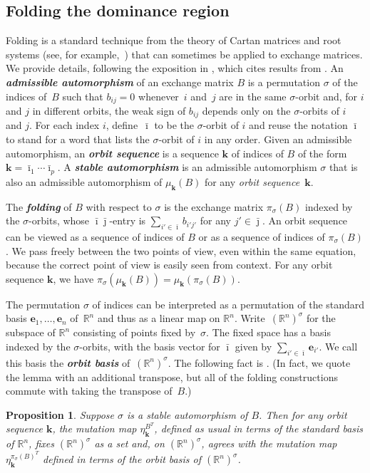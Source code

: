 \documentclass{amsart}
\newtheorem{proposition}{Proposition}[section]
\theoremstyle{definition}
\theoremstyle{remark}
\numberwithin{equation}{section}
\newcommand{\newword}[1]{\textbf{\emph{#1}}}
\newcommand{\reals}{\mathbb R}
\newcommand{\0}{{\mathbf{0}}}
\newcommand{\kk}{{\boldsymbol{k}}}
\newcommand{\e}{\mathbf{e}}
\begin{document}
\subsection{Folding the dominance region}\label{fold sec}
Folding is a standard technique from the theory of Cartan matrices and root systems (see, for example,~\cite{StembridgeFolding}) that can sometimes be applied to exchange matrices.
We provide details, following the exposition in \cite[Sections~2.3--2.4]{VielThesis}, which cites results from \cite{CaoHuangLi,DemonetThesis,DupontNonSimp,NS14}.
An \newword{admissible automorphism} of an exchange matrix $B$ is a permutation $\sigma$ of the indices of~$B$ such that $b_{ij}=0$ whenever~$i$ and~$j$ are in the same $\sigma$-orbit and, for $i$ and $j$ in different orbits, the weak sign of $b_{ij}$ depends only on the $\sigma$-orbits of $i$ and $j$.
For each index $i$, define~$\bar\imath$ to be the $\sigma$-orbit of $i$ and reuse the notation $\bar\imath$ to stand for a word that lists the $\sigma$-orbit of $i$ in any order.
Given an admissible automorphism, an \newword{orbit sequence} is a sequence $\kk$ of indices of $B$ of the form $\kk=\bar\imath_1\cdots\bar\imath_p$.
A \newword{stable automorphism} is an admissible automorphism $\sigma$ that is also an admissible automorphism of $\mu_\kk(B)$ for any \emph{orbit sequence}~$\kk$.

The \newword{folding} of $B$ with respect to $\sigma$ is the exchange matrix $\pi_\sigma(B)$ indexed by the $\sigma$-orbits, whose $\bar\imath\bar\jmath$-entry is $\sum_{i'\in\bar\imath}b_{i'j'}$ for any $j'\in\bar\jmath$.
An orbit sequence can be viewed as a sequence of indices of $B$ or as a sequence of indices of $\pi_\sigma(B)$.
We pass freely between the two points of view, even within the same equation, because the correct point of view is easily seen from context.
For any orbit sequence $\kk$, we have $\pi_\sigma(\mu_\kk(B))=\mu_\kk(\pi_\sigma(B))$.

The permutation $\sigma$ of indices can be interpreted as a permutation of the standard basis $\e_1,\ldots,\e_n$ of~$\reals^n$ and thus as a linear map on $\reals^n$.
Write~$(\reals^n)^\sigma$ for the subspace of $\reals^n$ consisting of points fixed by~$\sigma$.
The fixed space has a basis indexed by the $\sigma$-orbits, with the basis vector for $\bar\imath$ given by $\sum_{i'\in\bar\imath}\e_{i'}$.
We call this basis the \newword{orbit basis} of~$(\reals^n)^\sigma$.
The following fact is \cite[Lemma~2.4.6]{VielThesis}. 
(In fact, we quote the lemma with an additional transpose, but all of the folding constructions commute with taking the transpose of~$B$.)
\begin{proposition}\label{VielLemma}
Suppose $\sigma$ is a stable automorphism of $B$.
Then for any orbit sequence $\kk$, the mutation map $\eta^{B^T}_\kk$, defined as usual in terms of the standard basis of $\reals^n$, fixes $(\reals^n)^\sigma$ as a set and, on $(\reals^n)^\sigma$, agrees with the mutation map $\eta_\kk^{\pi_\sigma(B)^T}$ defined in terms of the orbit basis of $(\reals^n)^\sigma$.
\end{proposition}
\end{document}
